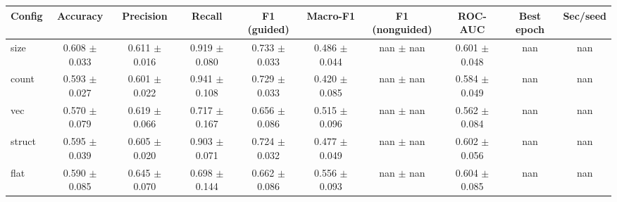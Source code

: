 \begin{tabular}{lccccccccc}
\hline
Config & Accuracy & Precision & Recall & F1 (guided) & Macro-F1 & F1 (nonguided) & ROC-AUC & Best epoch & Sec/seed \\
\hline
size & 0.608 $\pm$ 0.033 & 0.611 $\pm$ 0.016 & 0.919 $\pm$ 0.080 & 0.733 $\pm$ 0.033 & 0.486 $\pm$ 0.044 & nan $\pm$ nan & 0.601 $\pm$ 0.048 & nan & nan \\
count & 0.593 $\pm$ 0.027 & 0.601 $\pm$ 0.022 & 0.941 $\pm$ 0.108 & 0.729 $\pm$ 0.033 & 0.420 $\pm$ 0.085 & nan $\pm$ nan & 0.584 $\pm$ 0.049 & nan & nan \\
vec & 0.570 $\pm$ 0.079 & 0.619 $\pm$ 0.066 & 0.717 $\pm$ 0.167 & 0.656 $\pm$ 0.086 & 0.515 $\pm$ 0.096 & nan $\pm$ nan & 0.562 $\pm$ 0.084 & nan & nan \\
struct & 0.595 $\pm$ 0.039 & 0.605 $\pm$ 0.020 & 0.903 $\pm$ 0.071 & 0.724 $\pm$ 0.032 & 0.477 $\pm$ 0.049 & nan $\pm$ nan & 0.602 $\pm$ 0.056 & nan & nan \\
flat & 0.590 $\pm$ 0.085 & 0.645 $\pm$ 0.070 & 0.698 $\pm$ 0.144 & 0.662 $\pm$ 0.086 & 0.556 $\pm$ 0.093 & nan $\pm$ nan & 0.604 $\pm$ 0.085 & nan & nan \\
\hline
\end{tabular}
